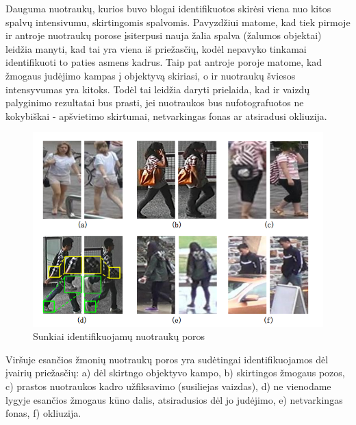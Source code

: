 \documentclass{VUMIFPSkursinis}
\begin{document}
Dauguma nuotraukų, kurios buvo blogai identifikuotos skirėsi viena nuo kitos spalvų intensivumu, skirtingomis spalvomis. Pavyzdžiui matome, kad tiek pirmoje ir antroje nuotraukų porose įsiterpusi nauja žalia spalva (žalumos objektai) leidžia manyti, kad tai yra viena iš priežasčių, kodėl nepavyko tinkamai identifikuoti to paties asmens kadrus. Taip pat antroje poroje matome, kad žmogaus judėjimo kampas į objektyvą skiriasi, o ir nuotraukų šviesos intensyvumas yra kitoks. Todėl tai leidžia daryti prielaida, kad ir vaizdų palyginimo rezultatai bus prasti, jei nuotraukos bus nufotografuotos ne kokybiškai - apšvietimo skirtumai, netvarkingas fonas ar atsiradusi okliuzija\cite{Person_reindentification}.

\begin{figure}[H]
\centering
\includegraphics[scale=1.0]{img/image_diff_examples.png}
\caption{Sunkiai identifikuojamų nuotraukų poros} %
\label{img:mlp}
\end{figure}
Viršuje esančios žmonių nuotraukų poros yra sudėtingai identifikuojamos dėl įvairių priežasčių: a) dėl skirtngo objektyvo kampo, b) skirtingos žmogaus pozos, c) prastos nuotraukos kadro užfiksavimo (susiliejas vaizdas), d) ne vienodame lygyje esančios žmogaus kūno dalis, atsiradusios dėl jo judėjimo, e) netvarkingas fonas, f) okliuzija.

\pagebreak
\end{document}
